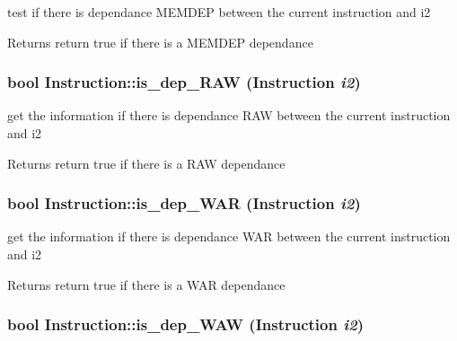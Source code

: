 test if there is dependance MEMDEP between the current instruction and i2 \begin{DoxyReturn}{Returns}
return true if there is a MEMDEP dependance 
\end{DoxyReturn}
\hypertarget{classInstruction_a757d13233614f3b81f340275e0ac03fc}{
\subsubsection[{is\_\-dep\_\-RAW}]{\setlength{\rightskip}{0pt plus 5cm}bool Instruction::is\_\-dep\_\-RAW ({\bf Instruction} {\em i2})}}
\label{classInstruction_a757d13233614f3b81f340275e0ac03fc}


get the information if there is dependance RAW between the current instruction and i2 \begin{DoxyReturn}{Returns}
return true if there is a RAW dependance 
\end{DoxyReturn}
\hypertarget{classInstruction_a22c2bbac305649d7f0ec17a04ef217fc}{
\subsubsection[{is\_\-dep\_\-WAR}]{\setlength{\rightskip}{0pt plus 5cm}bool Instruction::is\_\-dep\_\-WAR ({\bf Instruction} {\em i2})}}
\label{classInstruction_a22c2bbac305649d7f0ec17a04ef217fc}


get the information if there is dependance WAR between the current instruction and i2 \begin{DoxyReturn}{Returns}
return true if there is a WAR dependance 
\end{DoxyReturn}
\hypertarget{classInstruction_a6fd4dd46f540f0674486d559c1fbcd57}{
\subsubsection[{is\_\-dep\_\-WAW}]{\setlength{\rightskip}{0pt plus 5cm}bool Instruction::is\_\-dep\_\-WAW ({\bf Instruction} {\em i2})}}
\label{classInstruction_a6fd4dd46f540f0674486d559c1fbcd57}


